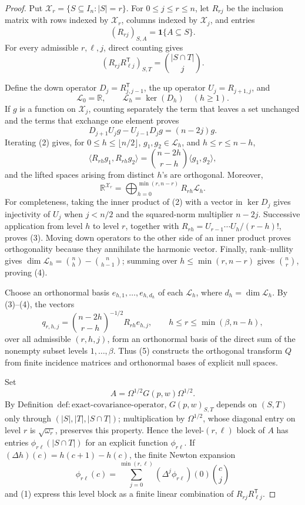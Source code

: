 \documentclass{article}
\begin{document}
\begin{proof}
Put \(\mathcal X_r=\{S\subseteq I_n:|S|=r\}\).  For \(0\le j\le r\le n\), let \(R_{rj}\) be the inclusion matrix with rows indexed by \(\mathcal X_r\), columns indexed by \(\mathcal X_j\), and entries
\[
(R_{rj})_{S,A}=\mathbf 1\{A\subseteq S\}.
\]
For every admissible \(r,\ell,j\), direct counting gives
\[
(R_{rj}R_{\ell j}^{\mathsf T})_{S,T}=\binom{|S\cap T|}{j}.
\tag{1}
\]

Define the down operator \(D_j=R_{j,j-1}^{\mathsf T}\), the up operator \(U_j=R_{j+1,j}\), and
\[
\mathcal L_0=\mathbb R,
\qquad
\mathcal L_h=\ker(D_h)\quad(h\ge1).
\]
If \(g\) is a function on \(\mathcal X_j\), counting separately the term that leaves a set unchanged and the terms that exchange one element proves
\[
D_{j+1}U_jg-U_{j-1}D_jg=(n-2j)g.
\tag{2}
\]
Iterating (2) gives, for \(0\le h\le\lfloor n/2\rfloor\), \(g_1,g_2\in\mathcal L_h\), and \(h\le r\le n-h\),
\[
\langle R_{rh}g_1,R_{rh}g_2\rangle
=\binom{n-2h}{r-h}\langle g_1,g_2\rangle,
\tag{3}
\]
and the lifted spaces arising from distinct \(h\)'s are orthogonal.  Moreover,
\[
\mathbb R^{\mathcal X_r}
=\bigoplus_{h=0}^{\min(r,n-r)}R_{rh}\mathcal L_h.
\tag{4}
\]
For completeness, taking the inner product of (2) with a vector in \(\ker D_j\) gives injectivity of \(U_j\) when \(j<n/2\) and the squared-norm multiplier \(n-2j\).  Successive application from level \(h\) to level \(r\), together with \(R_{rh}=U_{r-1}\cdots U_h/(r-h)!\), proves (3).  Moving down operators to the other side of an inner product proves orthogonality because they annihilate the harmonic vector.  Finally, rank--nullity gives \(\dim\mathcal L_h=\binom nh-\binom n{h-1}\); summing over \(h\le\min(r,n-r)\) gives \(\binom nr\), proving (4).

Choose an orthonormal basis \(e_{h,1},\ldots,e_{h,d_h}\) of each \(\mathcal L_h\), where \(d_h=\dim\mathcal L_h\).  By (3)--(4), the vectors
\[
q_{r,h,j}
=\binom{n-2h}{r-h}^{-1/2}R_{rh}e_{h,j},
\qquad
h\le r\le\min(\beta,n-h),
\tag{5}
\]
over all admissible \((r,h,j)\), form an orthonormal basis of the direct sum of the nonempty subset levels \(1,\ldots,\beta\).  Thus (5) constructs the orthogonal transform \(Q\) from finite incidence matrices and orthonormal bases of explicit null spaces.

Set
\[
A=\Omega^{1/2}G(p,w)\Omega^{1/2}.
\]
By Definition~\(\mathrm{def{:}exact\text{-}covariance\text{-}operator}\), \(G(p,w)_{S,T}\) depends on \((S,T)\) only through \((|S|,|T|,|S\cap T|)\); multiplication by \(\Omega^{1/2}\), whose diagonal entry on level \(r\) is \(\sqrt{\omega_r}\), preserves this property.  Hence the level-\((r,\ell)\) block of \(A\) has entries \(\phi_{r\ell}(|S\cap T|)\) for an explicit function \(\phi_{r\ell}\).  If \((\Delta h)(c)=h(c+1)-h(c)\), the finite Newton expansion
\[
\phi_{r\ell}(c)
=\sum_{j=0}^{\min(r,\ell)}(\Delta^j\phi_{r\ell})(0)\binom cj
\tag{6}
\]
and (1) express this level block as a finite linear combination of \(R_{rj}R_{\ell j}^{\mathsf T}\).


\end{proof}
\end{document}
